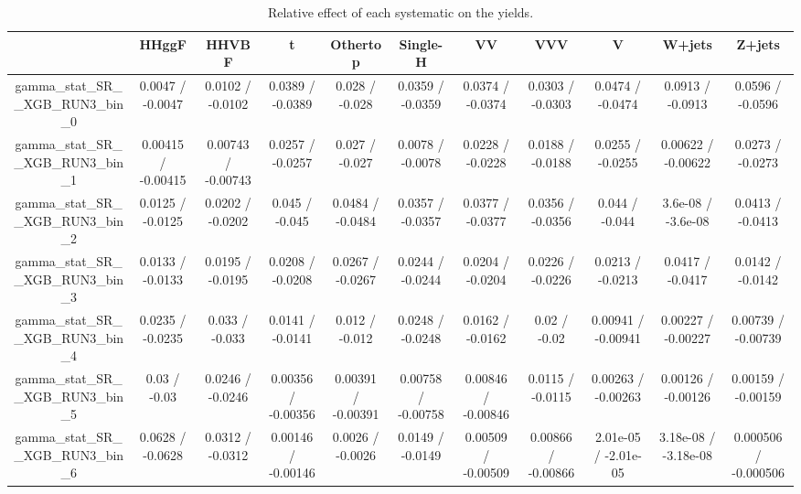 \documentclass[10pt]{article}
\begin{document}
\begin{table}[htbp]
\begin{center}
\begin{tabular}{|c|c|c|c|c|c|c|c|c|c|c|}
\hline 
      & HHggF      & HHVBF      & t      & Othertop      & Single-H      & VV      & VVV      & V      & W+jets      & Z+jets \\ 
\hline 
  gamma_stat_SR__XGB_RUN3_bin_0 & 0.0047 / -0.0047 & 0.0102 / -0.0102 & 0.0389 / -0.0389 & 0.028 / -0.028 & 0.0359 / -0.0359 & 0.0374 / -0.0374 & 0.0303 / -0.0303 & 0.0474 / -0.0474 & 0.0913 / -0.0913 & 0.0596 / -0.0596 \\ 
  gamma_stat_SR__XGB_RUN3_bin_1 & 0.00415 / -0.00415 & 0.00743 / -0.00743 & 0.0257 / -0.0257 & 0.027 / -0.027 & 0.0078 / -0.0078 & 0.0228 / -0.0228 & 0.0188 / -0.0188 & 0.0255 / -0.0255 & 0.00622 / -0.00622 & 0.0273 / -0.0273 \\ 
  gamma_stat_SR__XGB_RUN3_bin_2 & 0.0125 / -0.0125 & 0.0202 / -0.0202 & 0.045 / -0.045 & 0.0484 / -0.0484 & 0.0357 / -0.0357 & 0.0377 / -0.0377 & 0.0356 / -0.0356 & 0.044 / -0.044 & 3.6e-08 / -3.6e-08 & 0.0413 / -0.0413 \\ 
  gamma_stat_SR__XGB_RUN3_bin_3 & 0.0133 / -0.0133 & 0.0195 / -0.0195 & 0.0208 / -0.0208 & 0.0267 / -0.0267 & 0.0244 / -0.0244 & 0.0204 / -0.0204 & 0.0226 / -0.0226 & 0.0213 / -0.0213 & 0.0417 / -0.0417 & 0.0142 / -0.0142 \\ 
  gamma_stat_SR__XGB_RUN3_bin_4 & 0.0235 / -0.0235 & 0.033 / -0.033 & 0.0141 / -0.0141 & 0.012 / -0.012 & 0.0248 / -0.0248 & 0.0162 / -0.0162 & 0.02 / -0.02 & 0.00941 / -0.00941 & 0.00227 / -0.00227 & 0.00739 / -0.00739 \\ 
  gamma_stat_SR__XGB_RUN3_bin_5 & 0.03 / -0.03 & 0.0246 / -0.0246 & 0.00356 / -0.00356 & 0.00391 / -0.00391 & 0.00758 / -0.00758 & 0.00846 / -0.00846 & 0.0115 / -0.0115 & 0.00263 / -0.00263 & 0.00126 / -0.00126 & 0.00159 / -0.00159 \\ 
  gamma_stat_SR__XGB_RUN3_bin_6 & 0.0628 / -0.0628 & 0.0312 / -0.0312 & 0.00146 / -0.00146 & 0.0026 / -0.0026 & 0.0149 / -0.0149 & 0.00509 / -0.00509 & 0.00866 / -0.00866 & 2.01e-05 / -2.01e-05 & 3.18e-08 / -3.18e-08 & 0.000506 / -0.000506 \\ 
\hline 
\end{tabular} 
\caption{Relative effect of each systematic on the yields.} 
\end{center} 
\end{table} 
\end{document}
